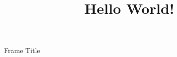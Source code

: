\documentclass[12pt]{beamer}
\title{Hello World!}
\author{}
\date{}
\begin{document}
\maketitle


\begin{frame}{Frame Title}

\end{frame}
\end{document}
